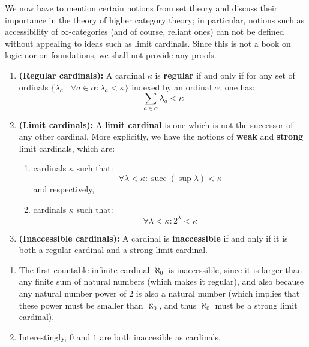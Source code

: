             We now have to mention certain notions from set theory and discuss their importance in the theory of higher category theory; in particular, notions such as accessibility of $\infty$-categories (and of course, reliant ones) can not be defined without appealing to ideas such as limit cardinals. Since this is not a book on logic nor on foundations, we shall not provide any proofs.
            \begin{definition} \label{def: limit_cardinal}
                \noindent
                \begin{enumerate}
                    \item \textbf{(Regular cardinals):} A cardinal $\kappa$ is \textbf{regular} if and only if for any set of ordinals $\{\lambda_a \mid \forall a \in \alpha: \lambda_a < \kappa\}$ indexed by an ordinal $\alpha$, one has:
                    $$\sum_{a \in \alpha} \lambda_a < \kappa$$ 
                    \item \textbf{(Limit cardinals):} A \textbf{limit cardinal} is one which is not the successor of any other cardinal. More explicitly, we have the notions of \textbf{weak} and \textbf{strong} limit cardinals, which are:
                        \begin{enumerate}
                            \item cardinals $\kappa$ such that:
                                $$\forall \lambda < \kappa: \operatorname{succ} (\sup \lambda) < \kappa$$
                            and respectively,
                            \item cardinals $\kappa$ such that:
                                $$\forall \lambda < \kappa: 2^{\lambda} < \kappa$$
                        \end{enumerate}
                    \item \textbf{(Inaccessible cardinals):} A cardinal is \textbf{inaccessible} if and only if it is both a regular cardinal and a strong limit cardinal.
                \end{enumerate}
            \end{definition}
            \begin{example}
                \noindent
                \begin{enumerate}
                    \item The first countable infinite cardinal $\aleph_0$ is inaccessible, since it is larger than any finite sum of natural numbers (which makes it regular), and also because any natural number power of $2$ is also a natural number (which implies that these power must be smaller than $\aleph_0$, and thus $\aleph_0$ must be a strong limit cardinal).
                    \item Interestingly, $0$ and $1$ are both inaccesible as cardinals.
                \end{enumerate}
            \end{example}
